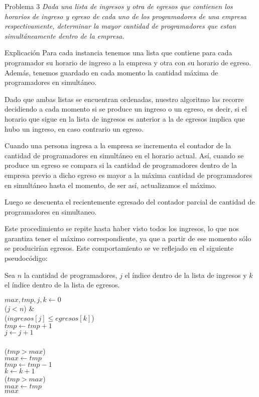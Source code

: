 \begin{section}{Problema 3}
	\textit{Dada una lista de ingresos y otra de egresos que contienen los horarios de ingreso y egreso de cada uno de los programadores de una empresa respectivamente, determinar la mayor cantidad de programadores que estan simultáneamente dentro de la empresa.}

	\begin{subsection}{Explicación}
		Para cada instancia tenemos una lista que contiene para cada programador su horario de ingreso a la empresa y otra con su horario de egreso. Además, tenemos guardado en cada momento la cantidad máxima de programadores en simultáneo.

Dado que ambas listas se encuentran ordenadas, nuestro algoritmo las recorre decidiendo a cada momento si se produce un ingreso o un egreso, es decir, si el horario que sigue en la lista de ingresos es anterior a la de egresos implica que hubo un ingreso, en caso contrario un egreso.

Cuando una persona ingresa a la empresa se incrementa el contador de la cantidad de programadores en simultáneo en el horario actual. Así, cuando se produce un egreso se compara si la cantidad de programadores dentro de la empresa previo a dicho egreso es mayor a la máxima cantidad de programadores en simultáneo hasta el momento, de ser así, actualizamos el máximo.

Luego se descuenta el recientemente egresado del contador parcial de cantidad de programadores en simultaneo.

Este procedimiento se repite hasta haber visto todos los ingresos, lo que nos garantiza tener el máximo correspondiente, ya que a partir de ese momento sólo se producirían egresos. Este comportamiento se ve reflejado en el siguiente pseudocódigo:

		\pagebreak
		Sea $n$ la cantidad de programadores, $j$ el índice dentro de la lista de ingresos y $k$ el índice dentro de la lista de egresos.
		
		\vspace{0.5cm}
		\begin{pseudo}
				\tab $max,tmp,j,k \leftarrow 0$ \\
				\tab \WHILE($j< n$) &   \\
				\tab \tab \IF($ingresos[j]\leq egresos[k]$) \\
				\tab \tab \tab $tmp \leftarrow tmp+1$ \\
				\tab \tab \tab $j \leftarrow j+1$ \\
				\tab \tab \ELSE \\
				\tab \tab \tab \IF($tmp>max$) \\
				\tab \tab \tab \tab $max \leftarrow tmp$ \\
				\tab \tab \tab $tmp \leftarrow tmp - 1$ \\
				\tab \tab \tab $k \leftarrow k+1$ \\
				\tab \IF($tmp>max$) \\
				\tab \tab $max \leftarrow tmp$ \\
				\tab \RET $max$
		\end{pseudo}





\end{subsection}
\end{section}
